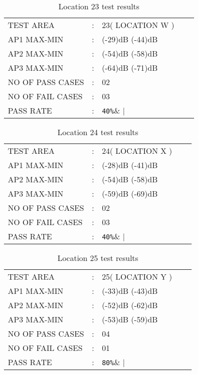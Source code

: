 \documentclass{report}
\begin{document}
\begin{table}[H]
	\centering
	\label{LOCATION TWENTY THREE TEST}
	\begin{tabular}{lllll}
		TEST AREA& :&  23( LOCATION W )&    \\
		AP1 MAX-MIN& :& (-29)dB (-44)dB&  \\
		AP2 MAX-MIN& :& (-54)dB (-58)dB&   \\
		AP3 MAX-MIN& :& (-64)dB (-71)dB&   \\
		NO OF PASS CASES& :& 02&  \\
		NO OF FAIL CASES& :& 03&   \\
		PASS RATE& :& \verb|40%|&   
	\end{tabular}
	\caption{Location 23 test results}
\end{table}

\begin{table}[H]
	\centering
	\label{LOCATION TWENTY FOUR TEST}
	\begin{tabular}{lllll}
		TEST AREA& :&  24( LOCATION X )&    \\
		AP1 MAX-MIN& :& (-28)dB (-41)dB&  \\
		AP2 MAX-MIN& :& (-54)dB (-58)dB&   \\
		AP3 MAX-MIN& :& (-59)dB (-69)dB&   \\
		NO OF PASS CASES& :& 02&  \\
		NO OF FAIL CASES& :& 03&   \\
		PASS RATE& :& \verb|40%|&   
	\end{tabular}
	\caption{Location 24 test results}
\end{table}

\begin{table}[H]
	\centering
	\label{LOCATION TWENTY FIVE TEST}
	\begin{tabular}{lllll}
		TEST AREA& :&  25( LOCATION Y )&    \\
		AP1 MAX-MIN& :& (-33)dB (-43)dB&  \\
		AP2 MAX-MIN& :& (-52)dB (-62)dB&   \\
		AP3 MAX-MIN& :& (-53)dB (-59)dB&   \\
		NO OF PASS CASES& :& 04&  \\
		NO OF FAIL CASES& :& 01&   \\
		PASS RATE& :& \verb|80%|&   
	\end{tabular}
	\caption{Location 25 test results}
\end{table}
\end{document}
